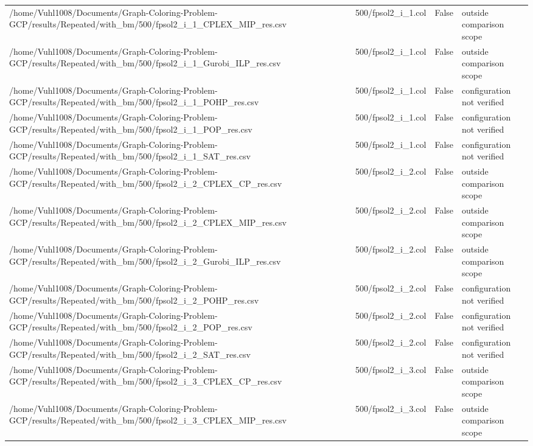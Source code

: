 \begin{table}[htbp]
\begin{tabular}{llll}
/home/Vuhl1008/Documents/Graph-Coloring-Problem-GCP/results/Repeated/with\_bm/500/fpsol2\_i\_1\_CPLEX\_MIP\_res.csv & 500/fpsol2\_i\_1.col & False & outside comparison scope \\
/home/Vuhl1008/Documents/Graph-Coloring-Problem-GCP/results/Repeated/with\_bm/500/fpsol2\_i\_1\_Gurobi\_ILP\_res.csv & 500/fpsol2\_i\_1.col & False & outside comparison scope \\
/home/Vuhl1008/Documents/Graph-Coloring-Problem-GCP/results/Repeated/with\_bm/500/fpsol2\_i\_1\_POHP\_res.csv & 500/fpsol2\_i\_1.col & False & configuration not verified \\
/home/Vuhl1008/Documents/Graph-Coloring-Problem-GCP/results/Repeated/with\_bm/500/fpsol2\_i\_1\_POP\_res.csv & 500/fpsol2\_i\_1.col & False & configuration not verified \\
/home/Vuhl1008/Documents/Graph-Coloring-Problem-GCP/results/Repeated/with\_bm/500/fpsol2\_i\_1\_SAT\_res.csv & 500/fpsol2\_i\_1.col & False & configuration not verified \\
/home/Vuhl1008/Documents/Graph-Coloring-Problem-GCP/results/Repeated/with\_bm/500/fpsol2\_i\_2\_CPLEX\_CP\_res.csv & 500/fpsol2\_i\_2.col & False & outside comparison scope \\
/home/Vuhl1008/Documents/Graph-Coloring-Problem-GCP/results/Repeated/with\_bm/500/fpsol2\_i\_2\_CPLEX\_MIP\_res.csv & 500/fpsol2\_i\_2.col & False & outside comparison scope \\
/home/Vuhl1008/Documents/Graph-Coloring-Problem-GCP/results/Repeated/with\_bm/500/fpsol2\_i\_2\_Gurobi\_ILP\_res.csv & 500/fpsol2\_i\_2.col & False & outside comparison scope \\
/home/Vuhl1008/Documents/Graph-Coloring-Problem-GCP/results/Repeated/with\_bm/500/fpsol2\_i\_2\_POHP\_res.csv & 500/fpsol2\_i\_2.col & False & configuration not verified \\
/home/Vuhl1008/Documents/Graph-Coloring-Problem-GCP/results/Repeated/with\_bm/500/fpsol2\_i\_2\_POP\_res.csv & 500/fpsol2\_i\_2.col & False & configuration not verified \\
/home/Vuhl1008/Documents/Graph-Coloring-Problem-GCP/results/Repeated/with\_bm/500/fpsol2\_i\_2\_SAT\_res.csv & 500/fpsol2\_i\_2.col & False & configuration not verified \\
/home/Vuhl1008/Documents/Graph-Coloring-Problem-GCP/results/Repeated/with\_bm/500/fpsol2\_i\_3\_CPLEX\_CP\_res.csv & 500/fpsol2\_i\_3.col & False & outside comparison scope \\
/home/Vuhl1008/Documents/Graph-Coloring-Problem-GCP/results/Repeated/with\_bm/500/fpsol2\_i\_3\_CPLEX\_MIP\_res.csv & 500/fpsol2\_i\_3.col & False & outside comparison scope \\

\end{tabular}
\end{table}
